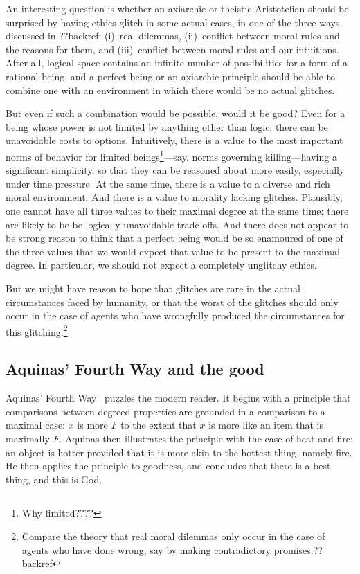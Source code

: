An interesting question is whether an axiarchic or theistic Aristotelian should be surprised by having ethics glitch in some actual cases, in one of 
the three ways discussed in ??backref: (i)~real dilemmas, (ii)~conflict between moral rules and the reasons for them, and (iii)~conflict between
moral rules and our intuitions. After all, logical space contains an infinite number of possibilities for a form of a rational 
being, and a perfect being or an axiarchic principle should be able to combine one with an environment in which there would be no actual glitches. 

But even if such a combination would be possible, would it be good? Even for a being
whose power is not limited by anything other than logic, there can be unavoidable costs to options. Intuitively, there is a value to
the most important norms of behavior for limited beings\footnote{Why limited????}---say, norms governing killing---having a significant simplicity, so that
they can be reasoned about more easily, especially under time pressure.  At the same
time, there is a value to a diverse and rich moral environment. And there is a value to morality lacking glitches. Plausibly,
one cannot have all three values to their maximal degree at the same time; there are likely to be be logically unavoidable trade-offs. 
And there does not appear to be strong reason to think that a perfect being would be so enamoured of one of the three values that
we would expect that value to be present to the maximal degree. In particular, we should not expect a completely unglitchy ethics.

But we might have reason to hope that glitches are rare in the actual circumstances faced by humanity, or that the worst of the
glitches should only occur in the case of agents who have wrongfully produced the circumstances for this glitching.\footnote{Compare the theory that real moral
dilemmas only occur in the case of agents who have done wrong, say by making contradictory promises.??backref} 

\subsection{Aquinas' Fourth Way and the good}
Aquinas' Fourth Way~\parencite[I.2.3]{AquinasST} puzzles the modern reader. It begins with a principle that comparisons between
degreed properties are grounded in a comparison to a maximal case: $x$ is more $F$ to the extent that $x$ is more 
like an item that is maximally $F$. Aquinas then illustrates the principle with the case of heat and fire:
an object is hotter provided that it is more akin to the hottest thing, namely fire. He then applies
the principle to goodness, and concludes that there is a best thing, and this is God.

